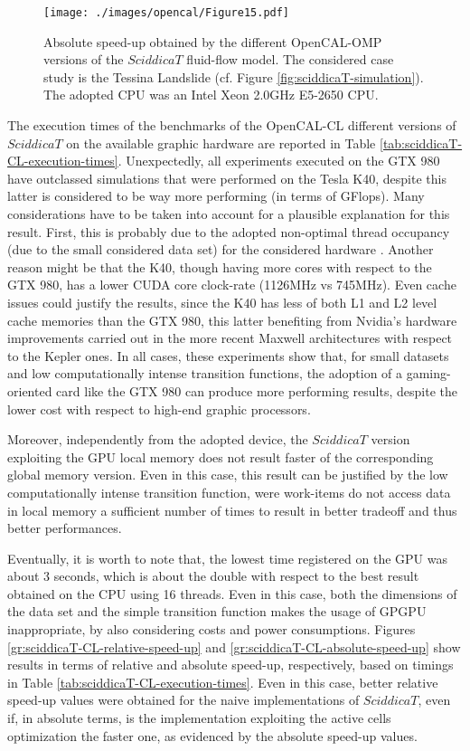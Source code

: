 \begin{figure}
	\begin{center}
		\texttt{[image: ./images/opencal/Figure15.pdf]}
		\caption{Absolute speed-up obtained by the different OpenCAL-OMP versions of
			the $SciddicaT$ fluid-flow model. The considered case study is the
			Tessina Landslide (cf. Figure \ref{fig:sciddicaT-simulation}). The
			adopted CPU was an Intel Xeon 2.0GHz E5-2650 CPU.}
		\label{gr:sciddicaT-OMP-absolute-speed-up}
	\end{center}
\end{figure}

The execution times of the benchmarks of the OpenCAL-CL different
versions of $SciddicaT$ on the available graphic hardware are
reported in Table
\ref{tab:sciddicaT-CL-execution-times}. Unexpectedly, all
experiments executed on the GTX 980 have outclassed simulations
that were performed on the Tesla K40, despite this latter is
considered to be way more performing (in terms of GFlops). Many
considerations have to be taken into account for a plausible
explanation for this result. First, this is probably due to the
adopted non-optimal thread occupancy (due to the small considered
data set) for the considered hardware \cite{Kirk-2010}. Another
reason might be that the K40, though having more cores with
respect to the GTX 980, has a lower CUDA core clock-rate (1126MHz
vs 745MHz). Even cache issues could justify the results, since the
K40 has less of both L1 and L2 level cache memories than the GTX
980, this latter benefiting from Nvidia's hardware improvements
carried out in the more recent Maxwell architectures with respect
to the Kepler ones. In all cases, these experiments show that, for
small datasets and low computationally intense transition
functions, the adoption of a gaming-oriented card like the GTX 980
can produce more performing results, despite the lower cost with
respect to high-end graphic processors.

Moreover, independently from the adopted device, the $SciddicaT$
version exploiting the GPU local memory does not result faster of
the corresponding global memory version. Even in this case, this
result can be justified by the low computationally intense
transition function, were work-items do not access data in local
memory a sufficient number of times to result in better tradeoff
and thus better performances.

Eventually, it is worth to note that, the lowest time registered
on the GPU was about 3 seconds, which is about the double with
respect to the best result obtained on the CPU using 16
threads. Even in this case, both the dimensions of the data set
and the simple transition function makes the usage of GPGPU
inappropriate, by also considering costs and power
consumptions. Figures \ref{gr:sciddicaT-CL-relative-speed-up} and
\ref{gr:sciddicaT-CL-absolute-speed-up} show results in terms of
relative and absolute speed-up, respectively, based on timings in
Table \ref{tab:sciddicaT-CL-execution-times}. Even in this case,
better relative speed-up values were obtained for the naive
implementations of $SciddicaT$, even if, in absolute terms, is the
implementation exploiting the active cells optimization the faster
one, as evidenced by the absolute speed-up values.

